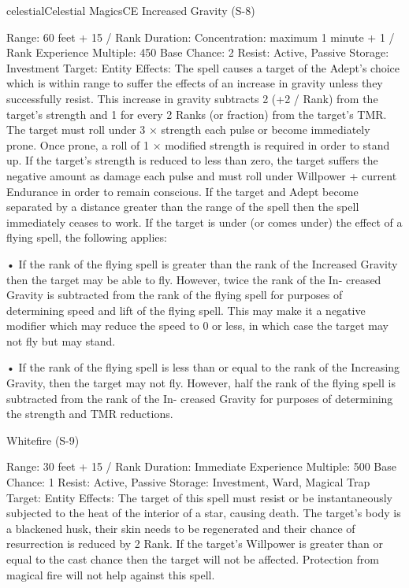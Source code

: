 \begin{College}[1.3]{celestial}{Celestial Magics}{CE}
Increased Gravity (S-8) 

Range: 60 feet + 15 / Rank 
Duration: Concentration: maximum 1 minute + 1 / 
Rank 
Experience Multiple: 450 
Base Chance: 2%
Resist: Active, Passive 
Storage: Investment 
Target: Entity 
Effects:  The  spell  causes  a  target  of  the  Adept’s 
choice which is within range to suffer the effects of 
an  increase  in  gravity  unless  they  successfully 
resist.  This  increase  in  gravity  subtracts  2  (+2  / 
Rank) from the target’s strength and 1 for every 2 
Ranks  (or  fraction)  from  the  target’s  TMR.  The 
target  must  roll  under  3  ×  strength  each  pulse  or 
become immediately prone. Once prone, a roll of 1 
×  modified  strength  is  required  in  order  to  stand 
up.  If  the  target’s  strength  is  reduced  to  less  than 
zero,  the  target  suffers  the  negative  amount  as 
damage each pulse and must roll under Willpower 
+ current Endurance in order to remain conscious. 
If  the  target  and  Adept  become  separated  by  a 
distance greater than the range of the spell then the 
spell  immediately  ceases  to  work.  If  the  target  is 
under (or comes under) the effect of a flying spell, 
the following applies:  

•  If  the  rank  of  the  flying  spell  is  greater  than  the 
rank  of  the  Increased  Gravity  then  the  target  may 
be  able  to  fly.  However,  twice  the  rank  of  the  In-
creased  Gravity  is  subtracted  from  the  rank  of  the 
flying spell for purposes of determining speed and 
lift of the flying spell. This may make it a negative 
modifier which may reduce the speed to 0 or  less, 
in which case the target may not fly but may stand.  

• If the rank of the flying spell is less than or equal 
to  the  rank  of  the  Increasing  Gravity,  then  the 
target  may  not  fly.  However,  half  the  rank  of  the 
flying  spell  is  subtracted  from  the  rank  of  the  In-
creased  Gravity  for  purposes  of  determining  the 
strength and TMR reductions. 

Whitefire (S-9) 

Range: 30 feet + 15 / Rank 
Duration: Immediate 
Experience Multiple: 500 
Base Chance: 1%
Resist: Active, Passive 
Storage: Investment, Ward, Magical Trap 
Target: Entity 
Effects:  The  target  of  this  spell  must  resist  or  be 
instantaneously subjected to the heat of the interior 
of  a  star,  causing  death.  The  target’s  body  is  a 
blackened husk, their skin needs to be regenerated 
and their chance of resurrection is reduced by 2%
Rank.  If  the  target’s  Willpower  is  greater  than  or 
equal to the cast chance then the target will not be 
affected. Protection from magical fire will not help 
against this spell. 


\end{College}
